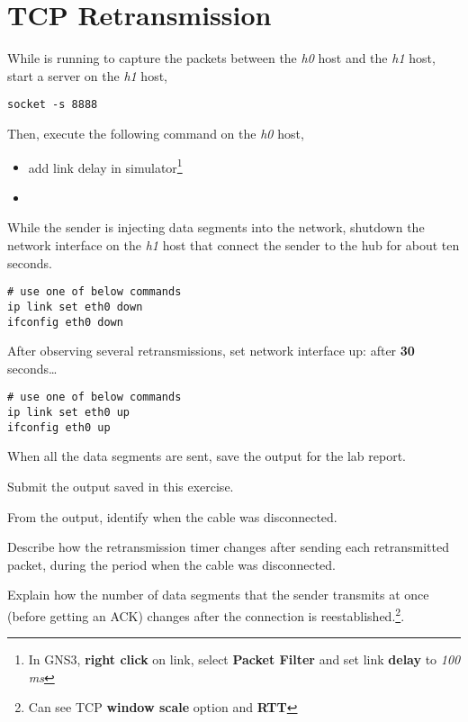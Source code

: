 \documentclass{../UTNetLab}
\begin{document}
\section{TCP Retransmission}
While  is running to capture the packets between the \textit{h0} host and the \textit{h1} host, start a  server on the \textit{h1} host,
\begin{lstlisting}
socket -s 8888
    \end{lstlisting}
Then, execute the following command on the \textit{h0} host,
\begin{itemize}
    \item add link delay in simulator\footnote{In GNS3, \textbf{right click} on link, select \textbf{Packet Filter} and set link \textbf{delay} to \textit{100 ms}}
    \item {}
\end{itemize}
While the sender is injecting data segments into the network, shutdown the network interface on the \textit{h1} host that connect the sender to the hub for about ten seconds.
\begin{lstlisting}[emph={eth0},morekeywords={[3]link,set,down}]
# use one of below commands
ip link set eth0 down
ifconfig eth0 down
    \end{lstlisting}

After observing several retransmissions, set network interface up:
after \textbf{30} seconds\ldots
\begin{lstlisting}[emph={eth0},morekeywords={[3]link,set,up}]
# use one of below commands
ip link set eth0 up
ifconfig eth0 up
    \end{lstlisting} %
When all the data segments are sent, save the  output for the lab report.

\begin{report}
    \item Submit the  output saved in this exercise.

    \item From the  output, identify when the cable was disconnected.

    \item Describe how the retransmission timer changes after sending each retransmitted packet, during the period when the cable was disconnected.

    \item Explain how the number of data segments that the sender transmits at once (before getting an ACK) changes after the connection is reestablished.\footnote{Can see TCP \textbf{window scale} option and \textbf{RTT}}.
\end{report}
\end{document}
